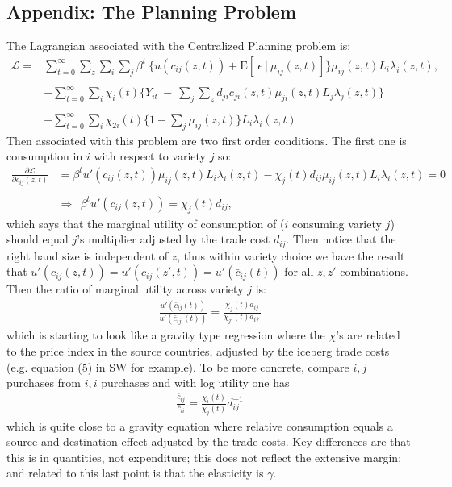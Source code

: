 \documentclass[12pt,pdftex]{article}
\begin{document}
\begin{onehalfspacing}
\section{Appendix: The Planning Problem}
The Lagrangian associated with the Centralized Planning problem is:
\begin{align}
\mathcal{L}  = & \sum_{t=0}^{\infty}  \sum\limits_{z} \sum_{i} \sum_{j} \beta^{t} \  \bigg \{  u(c_{ij}(z, t) ) + \mathrm{E}[ \ \epsilon \ | \ \mu_{ij}(z,t) ] \bigg \}\mu_{ij}(z,t) L_{i} \lambda_{i}(z, t), \\
\nonumber \\
&+ \sum_{t=0}^{\infty} \sum_{i} \chi_{i}(t) \bigg \{ Y_{it} \  - \ \sum_{j} \sum_{z} d_{ji} c_{ji}(z, t) \mu_{ji}(z,t) L_{j}\lambda_{j}(z, t) \bigg \} \nonumber \\
\nonumber \\
&+ \sum_{t=0}^{\infty} \sum_{i} \chi_{2i}(t) \bigg \{1 - \sum_{j}\mu_{ij}(z,t) \bigg \} L_{i} \lambda_{i}(z, t) \nonumber
\label{eq:pp}
\end{align}
Then associated with this problem are two first order conditions. The first one is consumption in $i$ with respect to variety $j$ so:
\begin{align}
\frac{\partial \mathcal{L} }{\partial c_{ij}(z, t)} &=  \beta^{t} u'(c_{ij}(z, t)) \mu_{ij}(z,t) L_{i} \lambda_{i}(z, t) - \chi_{j}(t) d_{ij} \mu_{ij}(z,t) L_{i} \lambda_{i}(z, t) = 0 \\
\nonumber \\
& \Rightarrow \ \ \beta^{t} u'(c_{ij}(z, t) ) = \chi_{j}(t) d_{ij},
\end{align}
which says that the marginal utility of consumption of ($i$ consuming variety $j$) should equal $j$'s multiplier adjusted by the trade cost $d_{ij}$. Then notice that the right hand size is independent of $z$, thus within variety choice we have the result that $u'(c_{ij}(z, t)) = u'(c_{ij}(z', t)) = u'(\bar c_{ij}(t))$ for all $z, z'$ combinations. Then the ratio of marginal utility across variety $j$ is:
\begin{align}
\frac{u'(\bar c_{ij}(t))}{u'(\bar c_{ij'}(t))} = \frac{\chi_{j}(t) d_{ij}}{\chi_{j'}(t) d_{ij'}}
\end{align}
which is starting to look like a gravity type regression where the $\chi$'s are related to the price index in the source countries, adjusted by the iceberg trade costs (e.g. equation (5) in SW for example). To be more concrete, compare $i,j$ purchases from $i,i$ purchases and with log utility one has
\begin{align}
\frac{\bar c_{ij} }{ \bar c_{ii}} = \frac{\chi_{i}(t)}{\chi_{j}(t)}d_{ij}^{-1}
\end{align}
which is quite close to a gravity equation where relative consumption equals a source and destination effect adjusted by the trade costs. Key differences are that this is in quantities, not expenditure; this does not reflect the extensive margin; and related to this last point is that the elasticity is $\gamma$.

\newpage



\end{onehalfspacing}
\end{document}
